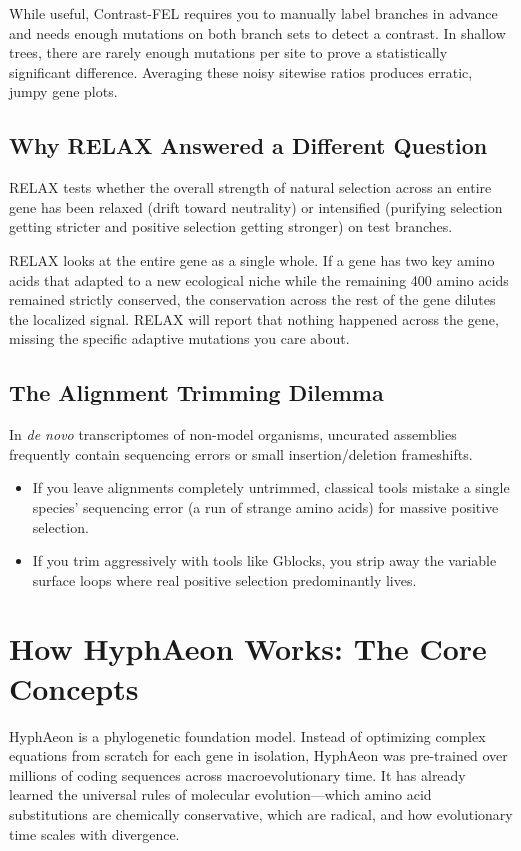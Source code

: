 \documentclass[11pt,a4paper]{article}
\begin{document}
While useful, Contrast-FEL requires you to manually label branches in advance and needs enough mutations on both branch sets to detect a contrast. In shallow trees, there are rarely enough mutations per site to prove a statistically significant difference. Averaging these noisy sitewise ratios produces erratic, jumpy gene plots.

\subsection{Why RELAX Answered a Different Question}
RELAX tests whether the overall strength of natural selection across an entire gene has been relaxed (drift toward neutrality) or intensified (purifying selection getting stricter and positive selection getting stronger) on test branches.

RELAX looks at the entire gene as a single whole. If a gene has two key amino acids that adapted to a new ecological niche while the remaining 400 amino acids remained strictly conserved, the conservation across the rest of the gene dilutes the localized signal. RELAX will report that nothing happened across the gene, missing the specific adaptive mutations you care about.

\subsection{The Alignment Trimming Dilemma}
In \textit{de novo} transcriptomes of non-model organisms, uncurated assemblies frequently contain sequencing errors or small insertion/deletion frameshifts. 
\begin{itemize}
    \item If you leave alignments completely untrimmed, classical tools mistake a single species' sequencing error (a run of strange amino acids) for massive positive selection.
    \item If you trim aggressively with tools like Gblocks, you strip away the variable surface loops where real positive selection predominantly lives.
\end{itemize}

\section{How HyphAeon Works: The Core Concepts}

HyphAeon is a phylogenetic foundation model. Instead of optimizing complex equations from scratch for each gene in isolation, HyphAeon was pre-trained over millions of coding sequences across macroevolutionary time. It has already learned the universal rules of molecular evolution---which amino acid substitutions are chemically conservative, which are radical, and how evolutionary time scales with divergence.
\end{document}
